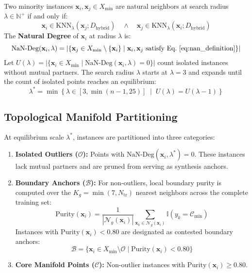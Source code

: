 \documentclass[sn-basic]{sn-jnl}
\begin{document}
Two minority instances $\mathbf{x}_i, \mathbf{x}_j \in X_{\min}$ are natural neighbors at search radius $\lambda \in \mathbb{N}^+$ if and only if:
\begin{equation}
\label{eq:nan_definition}
\mathbf{x}_i \in \text{KNN}_\lambda(\mathbf{x}_j; D_{\text{hybrid}}) \quad \land \quad \mathbf{x}_j \in \text{KNN}_\lambda(\mathbf{x}_i; D_{\text{hybrid}})
\end{equation}
The \textbf{Natural Degree} of $\mathbf{x}_i$ at radius $\lambda$ is:
\begin{equation}
\label{eq:nan_degree}
\text{NaN-Deg}(\mathbf{x}_i, \lambda) = \left| \left\{ \mathbf{x}_j \in X_{\min} \setminus \{\mathbf{x}_i\} \mid \mathbf{x}_i, \mathbf{x}_j \text{ satisfy Eq.~\eqref{eq:nan_definition}} \right\} \right|
\end{equation}
Let $U(\lambda) = |\{\mathbf{x}_i \in X_{\min} \mid \text{NaN-Deg}(\mathbf{x}_i, \lambda) = 0\}|$ count isolated instances without mutual partners. The search radius $\lambda$ starts at $\lambda=3$ and expands until the count of isolated points reaches an equilibrium:
\begin{equation}
\label{eq:equilibrium}
\lambda^* = \min \left\{ \lambda \in [3, \min(n-1, 25)] \;\middle|\; U(\lambda) = U(\lambda - 1) \right\}
\end{equation}

\subsection{Topological Manifold Partitioning}
\label{subsec:partitioning}
At equilibrium scale $\lambda^*$, instances are partitioned into three categories:
\begin{enumerate}
    \item \textbf{Isolated Outliers ($\mathcal{O}$):} Points with $\text{NaN-Deg}(\mathbf{x}_i, \lambda^*) = 0$. These instances lack mutual partners and are pruned from serving as synthesis anchors.
    \item \textbf{Boundary Anchors ($\mathcal{B}$):} For non-outliers, local boundary purity is computed over the $K_g = \min(7, N_{\text{tr}})$ nearest neighbors across the complete training set:
    \begin{equation}
    \label{eq:purity}
    \text{Purity}(\mathbf{x}_i) = \frac{1}{|\mathcal{N}_g(\mathbf{x}_i)|} \sum_{\mathbf{x}_k \in \mathcal{N}_g(\mathbf{x}_i)} \mathbb{I}(y_k = \mathcal{C}_{\min})
    \end{equation}
    Instances with $\text{Purity}(\mathbf{x}_i) < 0.80$ are designated as contested boundary anchors:
    \begin{equation}
    \label{eq:boundary_anchors}
    \mathcal{B} = \{\mathbf{x}_i \in X_{\min} \setminus \mathcal{O} \mid \text{Purity}(\mathbf{x}_i) < 0.80\}
    \end{equation}
    \item \textbf{Core Manifold Points ($\mathcal{C}$):} Non-outlier instances with $\text{Purity}(\mathbf{x}_i) \ge 0.80$.
\end{enumerate}
\end{document}
